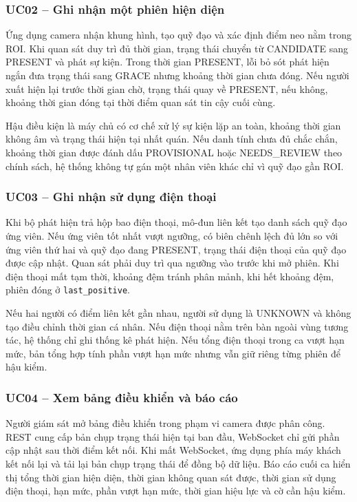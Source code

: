 \subsubsection{UC02 -- Ghi nhận một phiên hiện diện}
Ứng dụng camera nhận khung hình, tạo quỹ đạo và xác định điểm neo nằm trong ROI. Khi quan sát duy trì đủ thời gian, trạng thái chuyển từ CANDIDATE sang PRESENT và phát sự kiện. Trong thời gian PRESENT, lỗi bỏ sót phát hiện ngắn đưa trạng thái sang GRACE nhưng khoảng thời gian chưa đóng. Nếu người xuất hiện lại trước thời gian chờ, trạng thái quay về PRESENT, nếu không, khoảng thời gian đóng tại thời điểm quan sát tin cậy cuối cùng.

Hậu điều kiện là máy chủ có cơ chế xử lý sự kiện lặp an toàn, khoảng thời gian không âm và trạng thái hiện tại nhất quán. Nếu danh tính chưa đủ chắc chắn, khoảng thời gian được đánh dấu PROVISIONAL hoặc NEEDS\_REVIEW theo chính sách, hệ thống không tự gán một nhân viên khác chỉ vì quỹ đạo gần ROI.

\subsubsection{UC03 -- Ghi nhận sử dụng điện thoại}
Khi bộ phát hiện trả hộp bao điện thoại, mô-đun liên kết tạo danh sách quỹ đạo ứng viên. Nếu ứng viên tốt nhất vượt ngưỡng, có biên chênh lệch đủ lớn so với ứng viên thứ hai và quỹ đạo đang PRESENT, trạng thái điện thoại của quỹ đạo được cập nhật. Quan sát phải duy trì qua ngưỡng vào trước khi mở phiên. Khi điện thoại mất tạm thời, khoảng đệm tránh phân mảnh, khi hết khoảng đệm, phiên đóng ở \texttt{last\_positive}.

Nếu hai người có điểm liên kết gần nhau, người sử dụng là UNKNOWN và không tạo điều chỉnh thời gian cá nhân. Nếu điện thoại nằm trên bàn ngoài vùng tương tác, hệ thống chỉ ghi thống kê phát hiện. Nếu tổng điện thoại trong ca vượt hạn mức, bản tổng hợp tính phần vượt hạn mức nhưng vẫn giữ riêng từng phiên để hậu kiểm.

\subsubsection{UC04 -- Xem bảng điều khiển và báo cáo}
Người giám sát mở bảng điều khiển trong phạm vi camera được phân công. REST cung cấp bản chụp trạng thái hiện tại ban đầu, WebSocket chỉ gửi phần cập nhật sau thời điểm kết nối. Khi mất WebSocket, ứng dụng phía máy khách kết nối lại và tải lại bản chụp trạng thái để đồng bộ dữ liệu. Báo cáo cuối ca hiển thị tổng thời gian hiện diện, thời gian không quan sát được, thời gian sử dụng điện thoại, hạn mức, phần vượt hạn mức, thời gian hiệu lực và cờ cần hậu kiểm.


